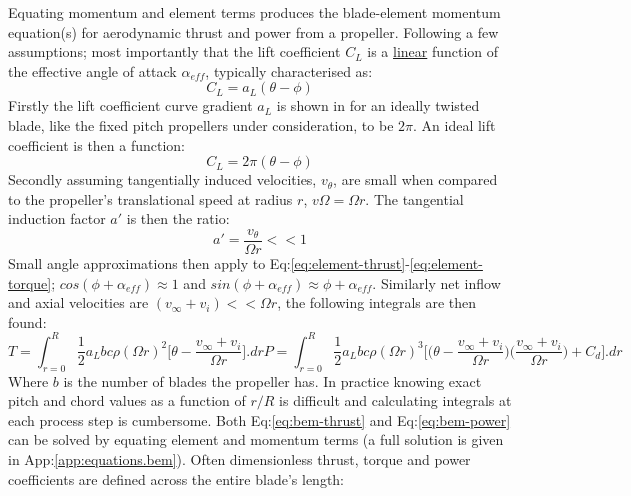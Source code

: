 Equating momentum and element terms produces the blade-element momentum equation(s) for aerodynamic thrust and power from a propeller. Following a few assumptions; most importantly that the lift coefficient $C_L$ is a \underline{linear} function of the effective angle of attack $\alpha_{eff}$, typically characterised as:
\begin{equation}
C_L=a_L(\theta-\phi)
\end{equation}
Firstly the lift coefficient curve gradient $a_L$ is shown in \cite{aerodynamicsforengineering} for an ideally twisted blade, like the fixed pitch propellers under consideration, to be $2\pi$. An ideal lift coefficient is then a function:
\begin{equation}\label{eq:lift-curve-gradient}
C_L=2\pi(\theta-\phi)
\end{equation}
Secondly assuming tangentially induced velocities, $v_\theta$, are small when compared to the propeller's translational speed at radius $r$, $v\Omega=\Omega r$. The tangential induction factor $a'$ is then the ratio:
\begin{equation}
a'=\frac{v_\theta}{\Omega r}<<1
\end{equation}
Small angle approximations then apply to Eq:\ref{eq:element-thrust}-\ref{eq:element-torque}; $cos(\phi+\alpha_{eff})\approx 1$ and $sin(\phi+\alpha_{eff})\approx \phi+\alpha_{eff}$. Similarly net inflow and axial velocities are $(v_\infty + v_i)<<\Omega r$, the following integrals are then found:
\begin{subequations}
\begin{equation}\label{eq:bem-thrust}
T=\int_{r=0}^R \frac{1}{2} a_L b c \rho (\Omega r)^2 \bigg[\theta-\frac{v_\infty+v_i}{\Omega r}\bigg].dr
\end{equation}
\begin{equation}\label{eq:bem-power}
P=\int_{r=0}^R \frac{1}{2}a_L b c \rho (\Omega r)^3\bigg[\big(\theta-\frac{v_\infty+v_i}{\Omega r}\big)\big(\frac{v_\infty+v_i}{\Omega r}\big) + C_d\bigg].dr
\end{equation}
\end{subequations}
Where $b$ is the number of blades the propeller has. In practice knowing exact pitch and chord values as a function of $r/R$ is difficult and calculating integrals at each process step is cumbersome. Both Eq:\ref{eq:bem-thrust} and Eq:\ref{eq:bem-power} can be solved by equating element and momentum terms (a full solution is given in App:\ref{app:equations.bem}). Often dimensionless thrust, torque and power coefficients are defined across the entire blade's length:
